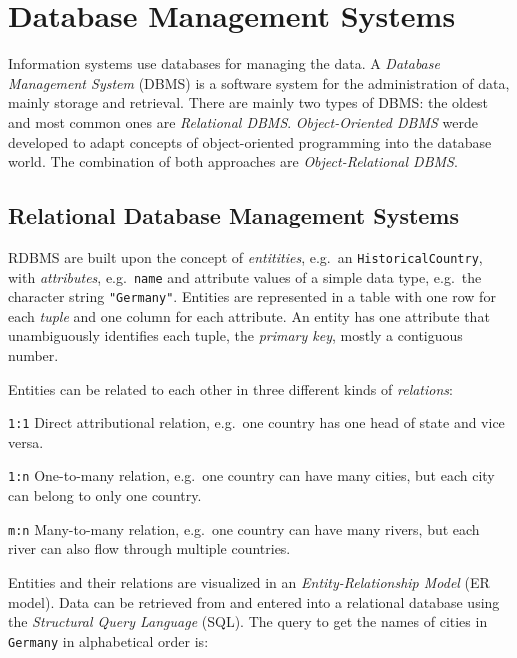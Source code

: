 
\section{Database Management Systems} %
\label{sec:database_management_systems}

Information systems use databases for managing the data. A \emph{Database Management System} (DBMS) is a software system for the administration of data, mainly storage and retrieval. There are mainly two types of DBMS: the oldest and most common ones are \emph{Relational DBMS}. \emph{Object-Oriented DBMS} werde developed to adapt concepts of object-oriented programming into the database world. The combination of both approaches are \emph{Object-Relational DBMS}.

\subsection{Relational Database Management Systems} %
\label{sub:relational_database_management_systems}

RDBMS are built upon the concept of \emph{entitities}, e.g.\ an \texttt{HistoricalCountry}, with \emph{attributes}, e.g.\ \texttt{name} and attribute values of a simple data type, e.g.\ the character string \texttt{"Germany"}. Entities are represented in a table with one row for each \emph{tuple} and one column for each attribute. An entity has one attribute that unambiguously identifies each tuple, the \emph{primary key}, mostly a contiguous number.

Entities can be related to each other in three different kinds of \emph{relations}:
\begin{compactenum}
  \item[\texttt{1:1}] Direct attributional relation, e.g.\ one country has one head of state and vice versa.
  \item[\texttt{1:n}] One-to-many relation, e.g.\ one country can have many cities, but each city can belong to only one country.
  \item[\texttt{m:n}] Many-to-many relation, e.g.\ one country can have many rivers, but each river can also flow through multiple countries.
\end{compactenum}

Entities and their relations are visualized in an \emph{Entity-Relationship Model} (ER model). Data can be retrieved from and entered into a relational database using the \emph{Structural Query Language} (SQL). The query to get the names of cities in \texttt{Germany} in alphabetical order is:


